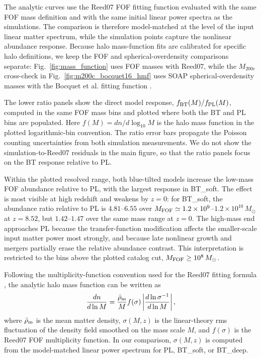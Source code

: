 \documentclass[
 reprint,
 superscriptaddress,
 nofootinbib,
 nobibnotes,
 amsmath,
 amssymb,
 aps,
 prd,
 floatfix,
 longbibliography
]{revtex4-2}
\begin{document}
The analytic curves use the Reed07 FOF fitting function \citep{Reed_2007} evaluated with the same FOF mass definition and with the same initial linear power spectra as the simulations. The comparison is therefore model-matched at the level of the input linear matter spectrum, while the simulation points capture the nonlinear abundance response. Because halo mass-function fits are calibrated for specific halo definitions, we keep the FOF and spherical-overdensity comparisons separate: Fig.~\ref{fig:mass_function} uses FOF masses with Reed07, while the $M_{200c}$ cross-check in Fig.~\ref{fig:m200c_bocquet16_hmf} uses SOAP spherical-overdensity masses with the Bocquet et al. fitting function \citep[hereafter B16]{Bocquet2016}.

The lower ratio panels show the direct model response, \(f_{\rm BT}(M)/f_{\rm PL}(M)\), computed in the same FOF mass bins and plotted where both the BT and PL bins are populated. Here \(f(M)=dn/d\log_{10}M\) is the halo mass function in the plotted logarithmic-bin convention. The ratio error bars propagate the Poisson counting uncertainties from both simulation measurements. We do not show the simulation-to-Reed07 residuals in the main figure, so that the ratio panels focus on the BT response relative to PL.

Within the plotted resolved range, both blue-tilted models increase the low-mass FOF abundance relative to PL, with the largest response in BT\_soft. The effect is most visible at high redshift and weakens by \(z=0\): for BT\_soft, the abundance ratio relative to PL is \(4.81\)--\(6.55\) over \(M_{\rm FOF}\simeq1.2\times10^9\)--\(1.2\times10^{10}\,M_\odot\) at \(z=8.52\), but \(1.42\)--\(1.47\) over the same mass range at \(z=0\). The high-mass end approaches PL because the transfer-function modification affects the smaller-scale input matter power most strongly, and because late nonlinear growth and mergers partially erase the relative abundance contrast. This interpretation is restricted to the bins above the plotted catalog cut, \(M_{\rm FOF}\ge10^8\,M_\odot\).

Following the multiplicity-function convention used for the Reed07 fitting formula \citep{Reed_2007}, the analytic halo mass function can be written as
\begin{equation}
\label{eq:hmf_multiplicity}
\frac{dn}{d\ln M}
=
\frac{\bar{\rho}_{\rm m}}{M}
f(\sigma)
\left|\frac{d\ln \sigma^{-1}}{d\ln M}\right| ,
\end{equation}
where \(\bar{\rho}_{\rm m}\) is the mean matter density, \(\sigma(M,z)\) is the linear-theory rms fluctuation of the density field smoothed on the mass scale \(M\), and \(f(\sigma)\) is the Reed07 FOF multiplicity function. In our comparison, \(\sigma(M,z)\) is computed from the model-matched linear power spectrum for PL, BT\_soft, or BT\_deep.
\end{document}
